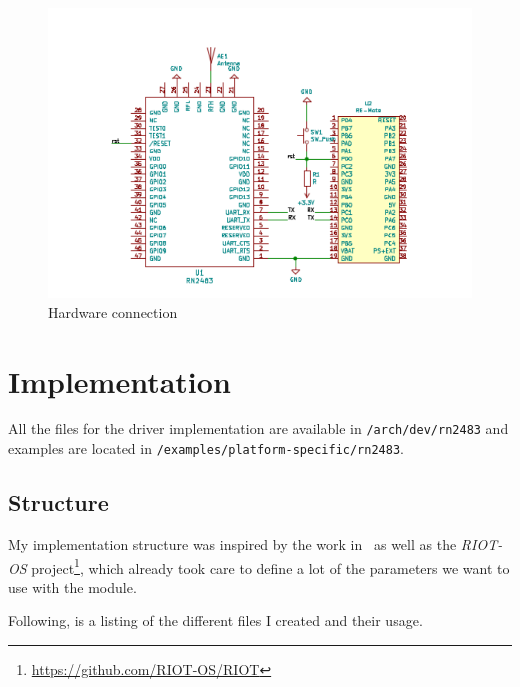 \begin{figure}[H]
  \centering
  \includegraphics[scale=0.70]{thesis.tex/chapters/driver/fig/conn_diag.pdf}
  \caption{Hardware connection\label{fig:schemaconn}}
\end{figure}

\section{Implementation}

All the files for the driver implementation are available in
\lstinline{/arch/dev/rn2483} and examples are located in
\lstinline{/examples/platform-specific/rn2483}.

\subsection{Structure}

My implementation structure was inspired by the work in~\cite{8847137} as well
as the \emph{RIOT-OS} project\footnote{\url{https://github.com/RIOT-OS/RIOT}}, which
already took care to define a lot of the parameters we want to use with the
module.

Following, is a listing of the different files I created and their usage.

